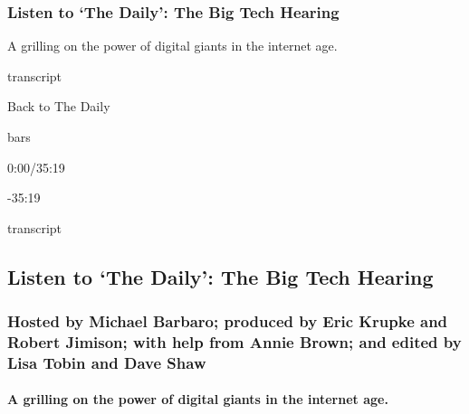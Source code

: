 \hypertarget{listen-to-the-daily-the-big-tech-hearing}{%
\subsubsection{Listen to `The Daily': The Big Tech
Hearing}\label{listen-to-the-daily-the-big-tech-hearing}}

A grilling on the power of digital giants in the internet age.

transcript

Back to The Daily

bars

0:00/35:19

-35:19

transcript

\hypertarget{listen-to-the-daily-the-big-tech-hearing-1}{%
\subsection{Listen to `The Daily': The Big Tech
Hearing}\label{listen-to-the-daily-the-big-tech-hearing-1}}

\hypertarget{hosted-by-michael-barbaro-produced-by-eric-krupke-and-robert-jimison-with-help-from-annie-brown-and-edited-by-lisa-tobin-and-dave-shaw}{%
\subsubsection{Hosted by Michael Barbaro; produced by Eric Krupke and
Robert Jimison; with help from Annie Brown; and edited by Lisa Tobin and
Dave
Shaw}\label{hosted-by-michael-barbaro-produced-by-eric-krupke-and-robert-jimison-with-help-from-annie-brown-and-edited-by-lisa-tobin-and-dave-shaw}}

\hypertarget{a-grilling-on-the-power-of-digital-giants-in-the-internet-age}{%
\paragraph{A grilling on the power of digital giants in the internet
age.}\label{a-grilling-on-the-power-of-digital-giants-in-the-internet-age}}

